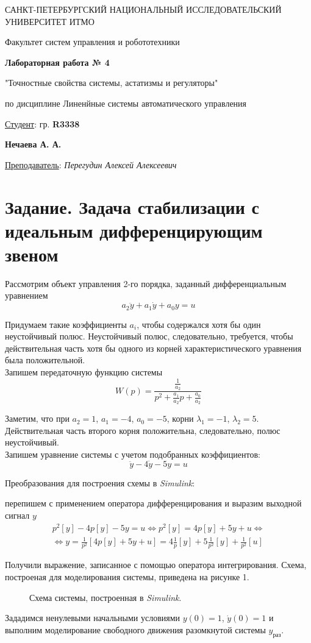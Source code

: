 \documentclass[a5paper, 10pt]{article}
\theoremstyle{definition}
\theoremstyle{plain}
\theoremstyle{remark}
\newcommand*{\titlePage}{
	\thispagestyle{title}
	\begingroup
	\begin{center}
		\vspace*{6ex}
		
		{\small
			САНКТ-ПЕТЕРБУРГСКИЙ НАЦИОНАЛЬНЫЙ ИССЛЕДОВАТЕЛЬСКИЙ УНИВЕРСИТЕТ ИТМО	
		}
		
		\vspace*{2ex}
		
		{\normalsize
			Факультет систем управления и робототехники
		}
		
		\vspace*{15ex}
		
		{\Large \bfseries 
			Лабораторная работа № 4
		}
\vspace*{2ex}
	{\Large \bfseries 
			
"Точностные свойства системы, астатизмы и регуляторы"
		}
\vspace*{2ex}
		
		{\normalsize
			по дисциплине Линенйные системы автоматического управления
		}

	\end{center}
	\vspace*{20ex}
	\begin{flushright}
		{\large 
			\underline{Студент}: гр. \textbf{R3338}\\
			\begin{flushright}
				\textbf{Нечаева А. А.}\\
			\end{flushright}
		}
		
		\vspace*{5ex}
		
		{\large 
			\underline{Преподаватель}: \textit{Перегудин Алексей Алексеевич}
		}
	\end{flushright}	
	\newpage
	\setcounter{page}{1}
	\endgroup}
\begin{document}
	\titlePage
	\pagestyle{style}
\newpage


\section{Задание. Задача стабилизации с идеальным дифференцирующим звеном}

Рассмотрим объект управления 2-го порядка, заданный дифференциальным уравнением
\begin{equation}
a_2 \ddot{y} + a_1 \dot{y} + a_0 y = u
\end{equation}

Придумаем такие коэффициенты $a_i$, чтобы содержался хотя бы один неустойчивый полюс. Неустойчивый полюс, следовательно, требуется, чтобы действительная часть хотя бы одного из корней характеристического уравнения была положительной.\\

Запишем передаточную функцию системы
\begin{equation}
W(p) = \frac{\frac{1}{a_2}}{p^2 + \frac{a_1}{a_2}p +  \frac{a_0}{a_2}}
\end{equation}

Заметим, что при $a_2 = 1$, $a_1 = -4$, $a_0 = -5$, корни $\lambda_1 = -1$, $\lambda_2 = 5$. Действительная часть второго корня положительна, следовательно, полюс неустойчивый.\\

Запишем уравнение системы с учетом подобранных коэффициентов:
\begin{equation}
 \ddot{y} -4 \dot{y} -5 y = u
\end{equation}

Преобразования для построения схемы в \textit{Simulink}:

перепишем с применением оператора дифференцирования и выразим выходной сигнал $y$
\begin{multline}
p^2[y] - 4p[y] - 5y = u \Leftrightarrow p^2[y] = 4p[y] + 5y + u \Leftrightarrow \\ \Leftrightarrow y = \frac{1}{p^2} \left[ 4p[y] + 5y + u  \right] =
4 \frac{1}{p} [y] + 5 \frac{1}{p^2} [y] + \frac{1}{p^2} [u]
\end{multline}

Получили выражение, записанное с помощью оператора интегрирования. Схема, построеная для моделирования системы, приведена на рисунке 1.

\begin{figure}[h!]
\caption{Схема системы, построенная в \textit{Simulink}.}
\end{figure}

\newpage
Зададимся ненулевыми начальными условиями $y(0) = 1$, $\dot{y} (0) = 1$ и выполним моделирование свободного движения разомкнутой системы $y_{\text{раз}}$.
\end{document}
